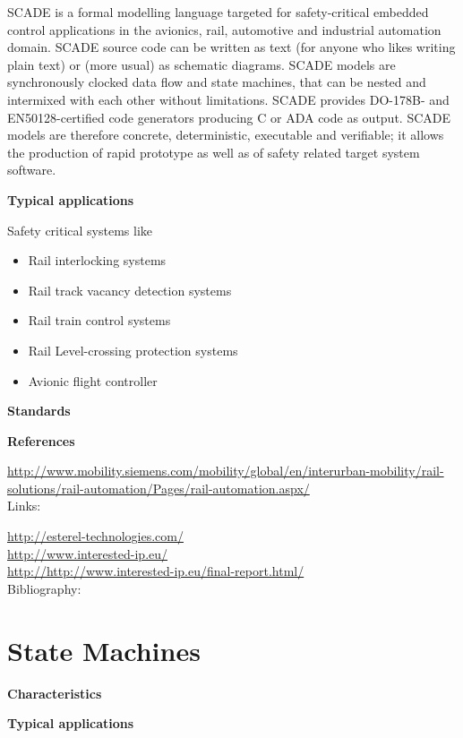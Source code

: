 \documentclass{./template/openetcs_report}
\begin{document}
SCADE is a formal modelling language targeted for safety-critical embedded control applications in the avionics, rail, automotive and industrial automation domain. SCADE source code can be written as text (for anyone who likes writing plain text) or (more usual) as schematic diagrams. SCADE models are synchronously clocked data flow and state machines, that can be nested and intermixed with each other without limitations. 
SCADE provides DO-178B- and EN50128-certified code generators producing C or ADA code as output. SCADE models are therefore concrete, deterministic, executable and verifiable; it allows the production of rapid prototype as well as of safety related target system software. 

	\textbf{Typical applications}

Safety critical systems like
\vspace{-10pt}
\begin{itemize}[topsep=2pt, partopsep=2pt,itemsep=2pt,parsep=2pt]
  \item Rail interlocking systems
  \item Rail track vacancy detection systems
  \item Rail train control systems
  \item Rail Level-crossing protection systems
  \item Avionic flight controller
\end{itemize}


	\textbf{Standards}


	\textbf{References}
	
\url{http://www.mobility.siemens.com/mobility/global/en/interurban-mobility/rail-solutions/rail-automation/Pages/rail-automation.aspx/} \\[4pt]	

Links:

\url{http://esterel-technologies.com/} \\[4pt]
\url{http://www.interested-ip.eu/}\\[4pt]
\url{http://http://www.interested-ip.eu/final-report.html/} \\[4pt]


Bibliography:

\section{State Machines}


	\textbf{Characteristics}


	\textbf{Typical applications}
\end{document}
